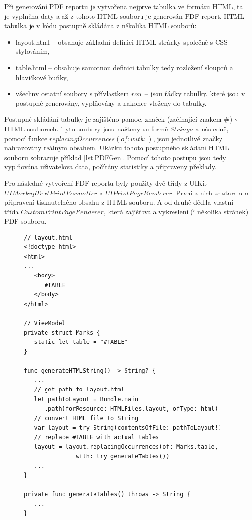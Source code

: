 \documentclass[thesis=M,czech]{FITthesis}[2012/06/26]
\begin{document}
Při generování PDF reportu je vytvořena nejprve tabulka ve formátu HTML, ta je vyplněna daty a až z tohoto HTML souboru je generován PDF report. HTML tabulka je v kódu postupně skládána z několika HTML souborů:
\begin{itemize}
\item layout.html -- obsahuje základní definici HTML stránky společně s CSS stylováním,
\item table.html -- obsahuje samotnou definici tabulky tedy rozložení sloupců  a hlavičkové buňky,
\item všechny ostatní soubory s přívlastkem $row$ -- jsou řádky tabulky, které jsou v postupně generovány, vyplňovány a nakonec vloženy do tabulky.
\end{itemize}
Postupné skládání tabulky je zajištěno pomocí značek (začínající znakem \#) v HTML souborech. Tyto soubory jsou načteny ve formě $Stringu$ a následně, pomocí funkce $replacingOccurrences(of:with:)$, jsou jednotlivé značky nahrazovány reálným obsahem. Ukázku tohoto postupného skládání HTML souboru zobrazuje příklad \ref{lst:PDFGen}. Pomocí tohoto postupu jsou tedy vyplňována uživatelova data, počítány statistiky a připraveny překlady.

Pro následné vytvoření PDF reportu byly použity dvě třídy z UIKit -- $UIMarkupTextPrintFormatter$ a $UIPrintPageRenderer$. První z nich se starala o připravení tisknutelného obsahu z HTML souboru. A od druhé dědila vlastní třída $CustomPrintPageRenderer$, která zajišťovala vykreslení (i několika stránek) PDF souboru.  

\begin{figure}
\begin{minipage}{\linewidth}
\begin{lstlisting}[caption={Ukázka postupného skládání HTML souboru},label={lst:PDFGen}]
// layout.html
<!doctype html>
<html>
...
   <body>
      #TABLE
   </body>
</html>

// ViewModel
private struct Marks {
   static let table = "#TABLE"
}

func generateHTMLString() -> String? {
   ...
   // get path to layout.html
   let pathToLayout = Bundle.main
      .path(forResource: HTMLFiles.layout, ofType: html)
   // convert HTML file to String
   var layout = try String(contentsOfFile: pathToLayout!)
   // replace #TABLE with actual tables
   layout = layout.replacingOccurrences(of: Marks.table, 
               with: try generateTables())
   ...
}

private func generateTables() throws -> String {
   ...
}
\end{lstlisting}
\end{minipage}
\end{figure}
\end{document}
